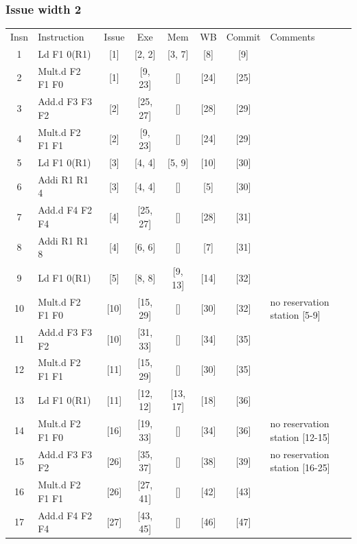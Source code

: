 \documentclass[11pt]{article}
\begin{document}
\subsubsection*{Issue width 2}
\begin{center}
\scriptsize
\setlength{\tabcolsep}{8pt}
\renewcommand{\arraystretch}{1.35}
\begin{tabular}{clccccc>{\raggedright\arraybackslash}p{1.4in}}
Insn & Instruction & Issue & Exe & Mem & WB & Commit & Comments \\
1 & Ld F1 0(R1) & [1] & [2, 2] & [3, 7] & [8] & [9] &  \\
2 & Mult.d F2 F1 F0 & [1] & [9, 23] & [] & [24] & [25] &  \\
3 & Add.d F3 F3 F2 & [2] & [25, 27] & [] & [28] & [29] &  \\
4 & Mult.d F2 F1 F1 & [2] & [9, 23] & [] & [24] & [29] &  \\
5 & Ld F1 0(R1) & [3] & [4, 4] & [5, 9] & [10] & [30] &  \\
6 & Addi R1 R1 4 & [3] & [4, 4] & [] & [5] & [30] &  \\
7 & Add.d F4 F2 F4 & [4] & [25, 27] & [] & [28] & [31] &  \\
8 & Addi R1 R1 8 & [4] & [6, 6] & [] & [7] & [31] &  \\
9 & Ld F1 0(R1) & [5] & [8, 8] & [9, 13] & [14] & [32] &  \\
10 & Mult.d F2 F1 F0 & [10] & [15, 29] & [] & [30] & [32] & no reservation station [5-9] \\
11 & Add.d F3 F3 F2 & [10] & [31, 33] & [] & [34] & [35] &  \\
12 & Mult.d F2 F1 F1 & [11] & [15, 29] & [] & [30] & [35] &  \\
13 & Ld F1 0(R1) & [11] & [12, 12] & [13, 17] & [18] & [36] &  \\
14 & Mult.d F2 F1 F0 & [16] & [19, 33] & [] & [34] & [36] & no reservation station [12-15] \\
15 & Add.d F3 F3 F2 & [26] & [35, 37] & [] & [38] & [39] & no reservation station [16-25] \\
16 & Mult.d F2 F1 F1 & [26] & [27, 41] & [] & [42] & [43] &  \\
17 & Add.d F4 F2 F4 & [27] & [43, 45] & [] & [46] & [47] &  \\
\end{tabular}
\end{center}
\end{document}
